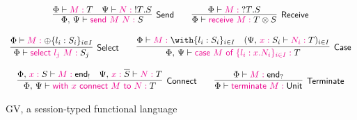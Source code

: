 \begin{figure*}
\[\begin{array}{c}
\\~\\

\inference{
  \Tp{\Phi} \Tpvdash \Tmof{M} \Tp{T} &
  \Tp{\Psi} \Tpvdash \Tmof{N} \Tp{\pwoutp{T}S}
}{Send}{
  \Tp{\Phi \comma \Psi} \Tpvdash \Tmof{\key{send}~M~N} \Tp{S}
}

\quad\quad

\inference{
  \Tp{\Phi} \Tpvdash \Tmof{M} \Tp{\pwinp{T}S}
}{Receive}{
  \Tp{\Phi} \Tpvdash \Tmof{\key{receive}~M} \Tp{T \otimes S}
}

\\~\\

\inference{
  \Tp{\Phi} \Tpvdash \Tmof{M} \Tp{\oplus \set{l_i : S_i}_{i \in I}}
}{Select}{
  \Tp{\Phi} \Tpvdash \Tmof{\key{select}~l_j~M} \Tp{S_j}
}

\quad\quad

\inference{
  \Tp{\Phi} \Tpvdash \Tmof{M} \Tp{\with \set{l_i : S_i}_{i \in I}}  &
  (\Tp{\Psi \comma \Tmof{x}S_i} \Tpvdash \Tmof{N_i} \Tp{T})_{\Tp{i \in I}}
}{Case}{
  \Tp{\Phi \comma \Psi} \Tpvdash
    \Tmof{\key{case}~M~\key{of}~\set{ l_i : x . N_i }_{i \in I}} \Tp{T}
}

\\~\\

\inference{
  \Tp{\Phi \comma \Tmof{x}S} \Tpvdash \Tmof{M} \Tp{\key{end}_!} &
  \Tp{\Psi \comma \Tmof{x}\overline{S}} \Tpvdash \Tmof{N} \Tp{T}
}{Connect}{
  \Tp{\Phi \comma \Psi} \Tpvdash \Tmof{\key{with}~x~\key{connect}~M~\key{to}~N} \Tp{T}
}

\quad\quad

\inference{
  \Tp{\Phi} \Tpvdash \Tmof{M} \Tp{\key{end}_?}
}{Terminate}{
  \Tp{\Phi} \Tpvdash \Tmof{\key{terminate}~M} \Tp{\key{Unit}}
}


\end{array}
\]

\caption{GV, a session-typed functional language}
\label{fig:gv}

\end{figure*}
